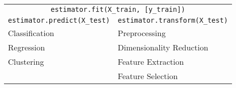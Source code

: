 \begin{table}[H]
    \begin{tabular}{ll}
        \hline
        \multicolumn{2}{c}{\verb|estimator.fit(X_train, [y_train])|}          \\
        \verb|estimator.predict(X_test)| & \verb|estimator.transform(X_test)| \\
        \hline
        Classification                   & Preprocessing                      \\
        Regression                       & Dimensionality Reduction           \\
        Clustering                       & Feature Extraction                 \\
                                         & Feature Selection                  \\
        \hline
    \end{tabular}
\end{table}

